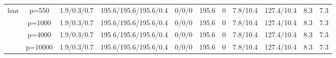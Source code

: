 \begin{table}[ht]
{\begin{tabular}{|c|c|ccccccccc|}
  \midrule\multirow{4}[2]{*}{lsnr} & p=550 & 1.9/0.3/0.7 & 195.6/195.6/195.6/0.4 & 0/0/0 & 195.6 & 0 & 7.8/10.4 & 127.4/10.4 & 8.3 & 7.3 \\ 
   & p=1000 & 1.9/0.3/0.7 & 195.6/195.6/195.6/0.4 & 0/0/0 & 195.6 & 0 & 7.8/10.4 & 127.4/10.4 & 8.3 & 7.3 \\ 
   & p=4000 & 1.9/0.3/0.7 & 195.6/195.6/195.6/0.4 & 0/0/0 & 195.6 & 0 & 7.8/10.4 & 127.4/10.4 & 8.3 & 7.3 \\ 
   & p=10000 & 1.9/0.3/0.7 & 195.6/195.6/195.6/0.4 & 0/0/0 & 195.6 & 0 & 7.8/10.4 & 127.4/10.4 & 8.3 & 7.3 \\ 
   \bottomrule 
\end{tabular}
}
\end{table}
